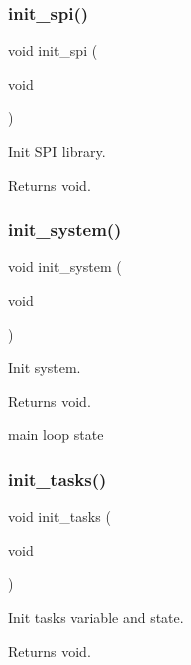\subsubsection{\texorpdfstring{init\+\_\+spi()}{init\_spi()}}
{\footnotesize\ttfamily void init\+\_\+spi (\begin{DoxyParamCaption}\item[{void}]{ }\end{DoxyParamCaption})}



Init S\+PI library. 

\begin{DoxyReturn}{Returns}
void. 
\end{DoxyReturn}
\mbox{\label{rmap_8ino_afceb890a6ab9be73cc5481369538c705}} 
\subsubsection{\texorpdfstring{init\+\_\+system()}{init\_system()}}
{\footnotesize\ttfamily void init\+\_\+system (\begin{DoxyParamCaption}\item[{void}]{ }\end{DoxyParamCaption})}



Init system. 

\begin{DoxyReturn}{Returns}
void. 
\end{DoxyReturn}
main loop state \mbox{\label{rmap_8ino_ab4bf0a3d77da083f131d3fa35a37d2b1}} 
\subsubsection{\texorpdfstring{init\+\_\+tasks()}{init\_tasks()}}
{\footnotesize\ttfamily void init\+\_\+tasks (\begin{DoxyParamCaption}\item[{void}]{ }\end{DoxyParamCaption})}



Init tasks variable and state. 

\begin{DoxyReturn}{Returns}
void. 
\end{DoxyReturn}
\mbox{\label{rmap_8ino_a980e73df66b14b1190bc25da430a4f12}} 
